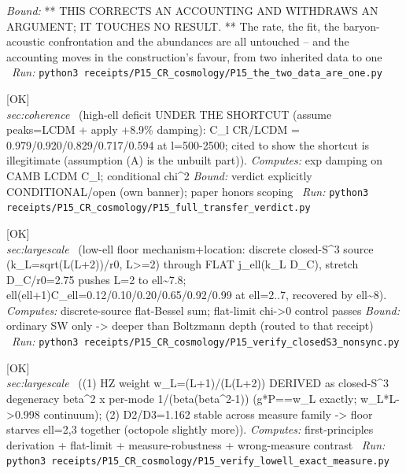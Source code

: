 \begin{description}
 \emph{Bound:} ** THIS CORRECTS AN ACCOUNTING AND WITHDRAWS AN ARGUMENT; IT TOUCHES NO RESULT. ** The rate, the fit, the baryon-acoustic confrontation and the abundances are all untouched -- and the accounting moves in the construction's favour, from two inherited data to one
\ \emph{Run:} \texttt{python3 receipts/P15\_CR\_cosmology/P15\_the\_two\_data\_are\_one.py}
\item[\rcptlabel{P15_full_transfer_verdict}{P15R27}\textbf{P15R27}\quad\texttt{P15\_full\_transfer\_verdict}]\hfill\textsf{[OK]}\\
\textit{sec:coherence} \ (high-ell deficit UNDER THE SHORTCUT (assume peaks=LCDM + apply +8.9\% damping): C\_l CR/LCDM = 0.979/0.920/0.829/0.717/0.594 at l=500-2500; cited to show the shortcut is illegitimate (assumption (A) is the unbuilt part)). 
\emph{Computes:} exp damping on CAMB LCDM C\_l; conditional chi\textasciicircum{}2
 \emph{Bound:} verdict explicitly CONDITIONAL/open (own banner); paper honors scoping
\ \emph{Run:} \texttt{python3 receipts/P15\_CR\_cosmology/P15\_full\_transfer\_verdict.py}
\item[\rcptlabel{P15_verify_closedS3_nonsync}{P15R28}\textbf{P15R28}\quad\texttt{P15\_verify\_closedS3\_nonsync}]\hfill\textsf{[OK]}\\
\textit{sec:largescale} \ (low-ell floor mechanism+location: discrete closed-S\textasciicircum{}3 source (k\_L=sqrt(L(L+2))/r0, L>=2) through FLAT j\_ell(k\_L D\_C), stretch D\_C/r0=2.75 pushes L=2 to ell\textasciitilde{}7.8; ell(ell+1)C\_ell=0.12/0.10/0.20/0.65/0.92/0.99 at ell=2..7, recovered by ell\textasciitilde{}8). 
\emph{Computes:} discrete-source flat-Bessel sum; flat-limit chi->0 control passes
 \emph{Bound:} ordinary SW only -> deeper than Boltzmann depth (routed to that receipt)
\ \emph{Run:} \texttt{python3 receipts/P15\_CR\_cosmology/P15\_verify\_closedS3\_nonsync.py}
\item[\rcptlabel{P15_verify_lowell_exact_measure}{P15R29}\textbf{P15R29}\quad\texttt{P15\_verify\_lowell\_exact\_measure}]\hfill\textsf{[OK]}\\
\textit{sec:largescale} \ ((1) HZ weight w\_L=(L+1)/(L(L+2)) DERIVED as closed-S\textasciicircum{}3 degeneracy beta\textasciicircum{}2 x per-mode 1/(beta(beta\textasciicircum{}2-1)) (g*P==w\_L exactly; w\_L*L->0.998 continuum); (2) D2/D3=1.162 stable across measure family -> floor starves ell=2,3 together (octopole slightly more)). 
\emph{Computes:} first-principles derivation + flat-limit + measure-robustness + wrong-measure contrast
\ \emph{Run:} \texttt{python3 receipts/P15\_CR\_cosmology/P15\_verify\_lowell\_exact\_measure.py}

\end{description}
